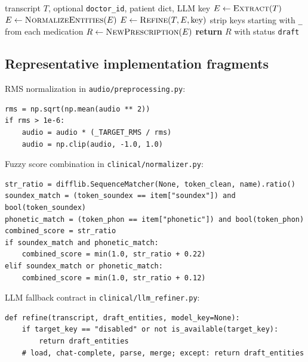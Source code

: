 \documentclass[11pt,a4paper]{article}
\begin{document}
\begin{algorithm}[htbp]
\caption{Draft prescription from transcript (\texttt{generate\_from\_transcript})}
\label{alg:rx}
\begin{algorithmic}[1]
\REQUIRE transcript $T$, optional \texttt{doctor\_id}, patient dict, LLM key
\STATE $E \leftarrow \textsc{Extract}(T)$ 
\STATE $E \leftarrow \textsc{NormalizeEntities}(E)$ 
\STATE $E \leftarrow \textsc{Refine}(T, E, \textrm{key})$ 
\ENDIF
\STATE strip keys starting with \texttt{\_} from each medication
\STATE $R \leftarrow \textsc{NewPrescription}(E)$
\STATE \textbf{return} $R$ with status \texttt{draft}
\end{algorithmic}
\end{algorithm}

\subsection{Representative implementation fragments}
RMS normalization in \texttt{audio/preprocessing.py}:
\begin{lstlisting}[caption={RMS loudness normalization toward $\rho^\star=0.08$.}]
rms = np.sqrt(np.mean(audio ** 2))
if rms > 1e-6:
    audio = audio * (_TARGET_RMS / rms)
    audio = np.clip(audio, -1.0, 1.0)
\end{lstlisting}

Fuzzy score combination in \texttt{clinical/normalizer.py}:
\begin{lstlisting}[caption={Combined string and phonetic score for drug matching.}]
str_ratio = difflib.SequenceMatcher(None, token_clean, name).ratio()
soundex_match = (token_soundex == item["soundex"]) and bool(token_soundex)
phonetic_match = (token_phon == item["phonetic"]) and bool(token_phon)
combined_score = str_ratio
if soundex_match and phonetic_match:
    combined_score = min(1.0, str_ratio + 0.22)
elif soundex_match or phonetic_match:
    combined_score = min(1.0, str_ratio + 0.12)
\end{lstlisting}

LLM fallback contract in \texttt{clinical/llm\_refiner.py}:
\begin{lstlisting}[caption={Public refine() returns the draft unchanged on any failure.}]
def refine(transcript, draft_entities, model_key=None):
    if target_key == "disabled" or not is_available(target_key):
        return draft_entities
    # load, chat-complete, parse, merge; except: return draft_entities
\end{lstlisting}
\end{document}
